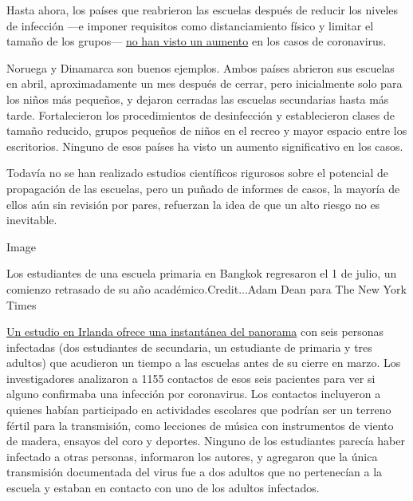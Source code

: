 Hasta ahora, los países que reabrieron las escuelas después de reducir
los niveles de infección ---e imponer requisitos como distanciamiento
físico y limitar el tamaño de los grupos---
\href{https://globalhealth.washington.edu/sites/default/files/COVID-19\%20Schools\%20Summary\%20\%282\%29.pdf?mkt_tok=eyJpIjoiTkRreE5XWXlORFF3TXpNeCIsInQiOiJIbVNQTTVySEo0Vzk1cHVBZVVqWnFGVmR1UEJxRGdpd01mTXg4OGw3Mk5nTnpmaUoyMGt2UXIwWVZBOE5GVjIybHA5aStrbzJ3MUxsanoxamZibmlocmpSbXZyVFVoV0VHYU1aTGx0RnpsMXlmOEtXSVJqaDJsZ0RJU1BQcVZjZSJ9}{no
han visto un aumento} en los casos de coronavirus.

Noruega y Dinamarca son buenos ejemplos. Ambos países abrieron sus
escuelas en abril, aproximadamente un mes después de cerrar, pero
inicialmente solo para los niños más pequeños, y dejaron cerradas las
escuelas secundarias hasta más tarde. Fortalecieron los procedimientos
de desinfección y establecieron clases de tamaño reducido, grupos
pequeños de niños en el recreo y mayor espacio entre los escritorios.
Ninguno de esos países ha visto un aumento significativo en los casos.

Todavía no se han realizado estudios científicos rigurosos sobre el
potencial de propagación de las escuelas, pero un puñado de informes de
casos, la mayoría de ellos aún sin revisión por pares, refuerzan la idea
de que un alto riesgo no es inevitable.

Image

Los estudiantes de una escuela primaria en Bangkok regresaron el 1 de
julio, un comienzo retrasado de su año académico.Credit...Adam Dean para
The New York Times

\href{https://www.eurosurveillance.org/content/10.2807/1560-7917.ES.2020.25.21.2000903\#html_fulltext}{Un
estudio en Irlanda ofrece una instantánea del panorama} con seis
personas infectadas (dos estudiantes de secundaria, un estudiante de
primaria y tres adultos) que acudieron un tiempo a las escuelas antes de
su cierre en marzo. Los investigadores analizaron a 1155 contactos de
esos seis pacientes para ver si alguno confirmaba una infección por
coronavirus. Los contactos incluyeron a quienes habían participado en
actividades escolares que podrían ser un terreno fértil para la
transmisión, como lecciones de música con instrumentos de viento de
madera, ensayos del coro y deportes. Ninguno de los estudiantes parecía
haber infectado a otras personas, informaron los autores, y agregaron
que la única transmisión documentada del virus fue a dos adultos que no
pertenecían a la escuela y estaban en contacto con uno de los adultos
infectados.

